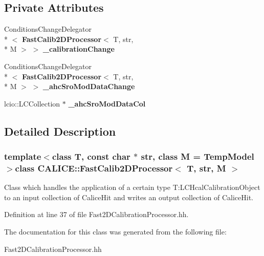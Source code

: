 \subsection*{Private Attributes}
\begin{DoxyCompactItemize}
\item 
Conditions\-Change\-Delegator\\*
$<$ {\bf Fast\-Calib2\-D\-Processor}$<$ T, str, \\*
M $>$ $>$ {\bfseries \-\_\-calibration\-Change}\label{classCALICE_1_1FastCalib2DProcessor_a54d843931315ba73e99210c44c5fca78}

\item 
Conditions\-Change\-Delegator\\*
$<$ {\bf Fast\-Calib2\-D\-Processor}$<$ T, str, \\*
M $>$ $>$ {\bfseries \-\_\-ahc\-Sro\-Mod\-Data\-Change}\label{classCALICE_1_1FastCalib2DProcessor_a407c59825c0f396ed42aa93e2fa1f3b9}

\item 
lcio\-::\-L\-C\-Collection $\ast$ {\bfseries \-\_\-ahc\-Sro\-Mod\-Data\-Col}\label{classCALICE_1_1FastCalib2DProcessor_ae08612f9f4ea6ec8638027e52549fbe7}

\end{DoxyCompactItemize}


\subsection{Detailed Description}
\subsubsection*{template$<$class T, const char $\ast$ str, class M = Temp\-Model$>$class C\-A\-L\-I\-C\-E\-::\-Fast\-Calib2\-D\-Processor$<$ T, str, M $>$}

Class which handles the application of a certain type T\-:L\-C\-Hcal\-Calibration\-Object to an input collection of Calice\-Hit and writes an output collection of Calice\-Hit. 

Definition at line 37 of file Fast2\-D\-Calibration\-Processor.\-hh.



The documentation for this class was generated from the following file\-:\begin{DoxyCompactItemize}
\item 
Fast2\-D\-Calibration\-Processor.\-hh\end{DoxyCompactItemize}
